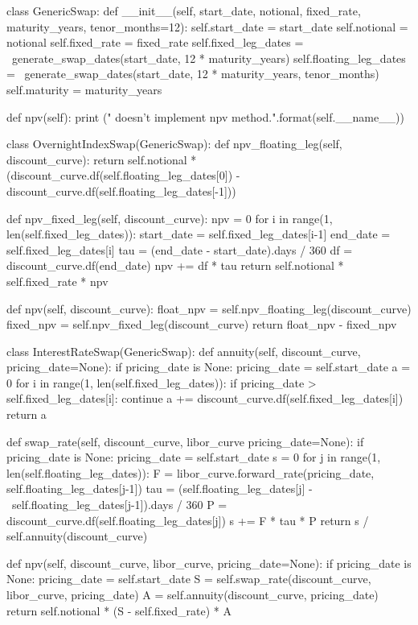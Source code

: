 \begin{ipython}
class GenericSwap:
    def __init__(self, start_date, notional,
                 fixed_rate, maturity_years, tenor_months=12):
        self.start_date = start_date        
        self.notional = notional
        self.fixed_rate = fixed_rate
        self.fixed_leg_dates = \
            generate_swap_dates(start_date, 12 * maturity_years)
        self.floating_leg_dates = \
            generate_swap_dates(start_date, 12 * maturity_years, tenor_months)
        self.maturity = maturity_years

    def npv(self):
        print ("{} doesn't implement npv method.".format(self.__name__))

class OvernightIndexSwap(GenericSwap):
    def npv_floating_leg(self, discount_curve):
        return self.notional * (discount_curve.df(self.floating_leg_dates[0]) -
            discount_curve.df(self.floating_leg_dates[-1]))

    def npv_fixed_leg(self, discount_curve):
        npv = 0
        for i in range(1, len(self.fixed_leg_dates)):
            start_date = self.fixed_leg_dates[i-1]
            end_date = self.fixed_leg_dates[i]
            tau = (end_date - start_date).days / 360
            df = discount_curve.df(end_date)
            npv += df * tau 
        return self.notional * self.fixed_rate * npv

    def npv(self, discount_curve):
        float_npv = self.npv_floating_leg(discount_curve)
        fixed_npv = self.npv_fixed_leg(discount_curve)
        return float_npv - fixed_npv

class InterestRateSwap(GenericSwap):
    def annuity(self, discount_curve, pricing_date=None):
        if pricing_date is None:
            pricing_date = self.start_date
        a = 0
        for i in range(1, len(self.fixed_leg_dates)):
            if pricing_date > self.fixed_leg_dates[i]:
                continue
            a += discount_curve.df(self.fixed_leg_dates[i])
        return a

    def swap_rate(self, discount_curve, libor_curve pricing_date=None):
        if pricing_date is None:
            pricing_date = self.start_date
        s = 0
        for j in range(1, len(self.floating_leg_dates)):
            F = libor_curve.forward_rate(pricing_date, self.floating_leg_dates[j-1])
            tau = (self.floating_leg_dates[j] - \
                self.floating_leg_dates[j-1]).days / 360
            P = discount_curve.df(self.floating_leg_dates[j])
            s += F * tau * P
        return s / self.annuity(discount_curve)

    def npv(self, discount_curve, libor_curve, pricing_date=None):
        if pricing_date is None:
            pricing_date = self.start_date
        S = self.swap_rate(discount_curve, libor_curve, pricing_date)
        A = self.annuity(discount_curve, pricing_date)
        return self.notional * (S - self.fixed_rate) * A
\end{ipython}
